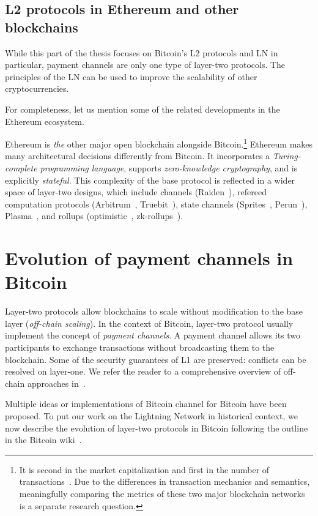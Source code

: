 \subsection{L2 protocols in Ethereum and other blockchains}

While this part of the thesis focuses on Bitcoin's L2 protocols and LN in particular, payment channels are only one type of layer-two protocols.
The principles of the LN can be used to improve the scalability of other cryptocurrencies. 


For completeness, let us mention some of the related developments in the Ethereum ecosystem.

Ethereum is \textit{the} other major open blockchain alongside Bitcoin.\footnote{It is second in the market capitalization and first in the number of transactions~\cite{Coinmetrics}. Due to the differences in transaction mechanics and semantics, meaningfully comparing the metrics of these two major blockchain networks is a separate research question.}
Ethereum makes many architectural decisions differently from Bitcoin.
It incorporates a \textit{Turing-complete programming language}, supports \textit{zero-knowledge cryptography}, and is explicitly \textit{stateful}.
This complexity of the base protocol is reflected in a wider space of layer-two designs, which include channels (Raiden~\cite{RaidenWebsite}), refereed computation protocols (Arbitrum~\cite{Kalodner2018}, Truebit~\cite{Teutsch2017}), state channels (Sprites~\cite{Miller2019}, Perun~\cite{Dziembowski2017}), Plasma~\cite{Poon2017}, and rollups (optimistic~\cite{Floersch2019}, zk-rollups~\cite{Gluchowski2019}).


\section{Evolution of payment channels in Bitcoin}

Layer-two protocols allow blockchains to scale without modification to the base layer (\textit{off-chain scaling}).
In the context of Bitcoin, layer-two protocol usually implement the concept of \textit{payment channels}.
A payment channel allows its two participants to exchange transactions without broadcasting them to the blockchain.
Some of the security guarantees of L1 are preserved: conflicts can be resolved on layer-one.
We refer the reader to a comprehensive overview of off-chain approaches in~\cite{Gudgeon2019}.

Multiple ideas or implementations of Bitcoin channel for Bitcoin have been proposed.
To put our work on the Lightning Network in historical context, we now describe the evolution of layer-two protocols in Bitcoin following the outline in the Bitcoin wiki~\cite{BitcoinWikiChannels}.

